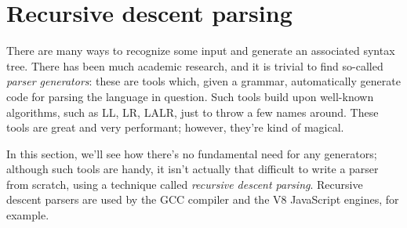 \documentclass[12pt,american,draft]{PhdThesis}
\begin{document}
  \section{Recursive descent parsing}

  There are many ways to recognize some input and generate an associated syntax tree. There has been
  much academic research, and it is trivial to find so-called \emph{parser generators}: these are
  tools which, given a grammar, automatically generate code for parsing the language in question.
  Such tools build upon well-known algorithms, such as LL, LR, LALR, just to throw a few names
  around. These tools are great and very performant; however, they're kind of magical.

  In this section, we'll see how there's no fundamental need for any generators; although such tools
  are handy, it isn't actually that difficult to write a parser from scratch, using a technique
  called \emph{recursive descent parsing}. Recursive descent parsers are used by the GCC compiler
  and the V8 JavaScript engines, for example\cite{nystrom}.

  \backmatter





  \backmatter

  
  

\end{document}
